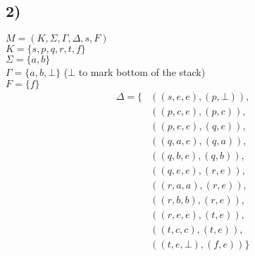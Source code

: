 \documentclass[12pt]{article}
\begin{document}
\subsection*{2)}
$M = (K,\Sigma, \Gamma, \Delta, s, F)$ \\
$K = \{s,p,q,r,t,f\}$ \\ 
$\Sigma = \{a,b\}$ \\ 
$\Gamma = \{a,b, \bot \}$ ($\bot$ to mark bottom of the stack)\\ 
$F = \{f\}$
\begin{equation*}
    \begin{split}
        \Delta = \{&((s,e,e),(p,\bot)),\\
                   &((p,c,e),(p,c)),\\
                   &((p,e,e),(q,e)),\\
                   &((q,a,e),(q,a)),\\
                   &((q,b,e),(q,b)),\\
                   &((q,e,e),(r,e)),\\
                   &((r,a,a),(r,e)),\\
                   &((r,b,b),(r,e)),\\
                   &((r,e,e),(t,e)),\\
                   &((t,c,c),(t,e)),\\
                   &((t,e,\bot),(f,e)) \}
    \end{split}
\end{equation*}
\end{document}
